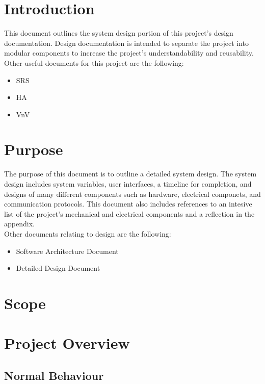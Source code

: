 \documentclass[12pt, titlepage]{article}
\begin{document}
\section{Introduction}
This document outlines the system design portion of this project's design documentation. Design documentation 
is intended to separate the project into modular components to increase the project's understandability and reusability. \\
Other useful documents for this project are the following:
\begin{itemize}
  \item SRS
  \item HA
  \item VnV
\end{itemize}

\section{Purpose}
The purpose of this document is to outline a detailed system design. The system design includes system variables, user interfaces, a timeline for completion, and designs of many 
different components such as hardware, electrical componets, and communication protocols. This document also includes references to an intesive list of the project's
mechanical and electrical components and a reflection in the appendix. \\
Other documents relating to design are the following:
\begin{itemize}
  \item Software Architecture Document
  \item Detailed Design Document
\end{itemize}
\section{Scope}


\section{Project Overview}

\subsection{Normal Behaviour}
\end{document}
